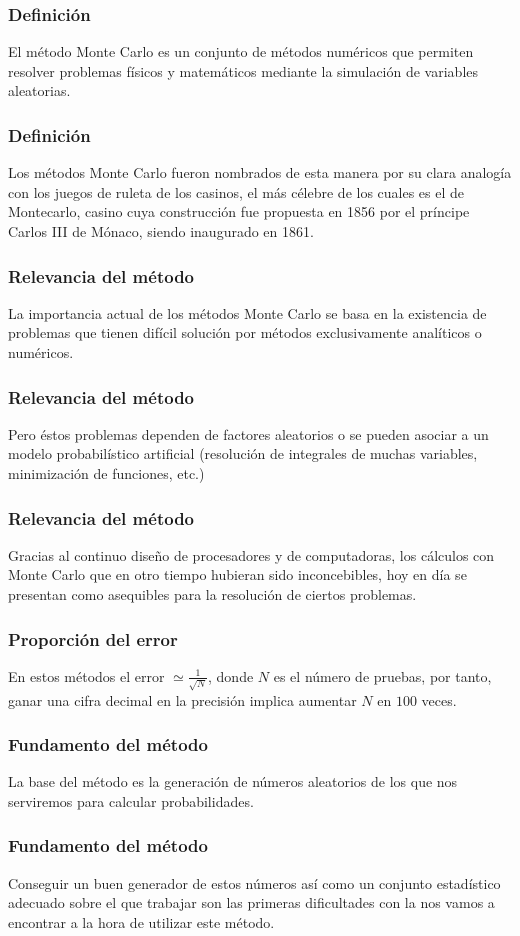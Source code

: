 \documentclass[12pt]{beamer}
\begin{document}
\begin{frame}
\frametitle{Definición}
El método Monte Carlo es un conjunto de métodos numéricos que permiten resolver problemas físicos y matemáticos mediante la simulación de variables aleatorias.
\end{frame}
\begin{frame}
\frametitle{Definición}
Los métodos Monte Carlo fueron nombrados de esta manera por su clara analogía con los juegos de ruleta de los casinos, \pause el más célebre de los cuales es el de Montecarlo, casino cuya construcción fue propuesta en 1856 por el príncipe Carlos III de Mónaco, siendo inaugurado en 1861.
\end{frame}
\begin{frame}
\frametitle{Relevancia del método}
La importancia actual de los métodos Monte Carlo se basa en la existencia de problemas que tienen difícil solución por métodos exclusivamente analíticos o numéricos.
\end{frame}
\begin{frame}
\frametitle{Relevancia del método}
Pero éstos problemas dependen de factores aleatorios o se pueden asociar a un modelo probabilístico artificial (resolución de integrales de muchas variables, minimización de funciones, etc.)
\end{frame}
\begin{frame}
\frametitle{Relevancia del método}
Gracias al continuo diseño de procesadores y de computadoras, los cálculos con Monte Carlo que en otro tiempo hubieran sido inconcebibles, hoy en día se presentan como asequibles para la resolución de ciertos problemas.
\end{frame}
\begin{frame}
 \frametitle{Proporción del error}
En estos métodos el error $\simeq \frac{1}{\sqrt{N}}$, \pause donde $N$ es el número de pruebas, por tanto, ganar una cifra decimal en la precisión implica aumentar $N$ en $100$ veces.
\end{frame}
\begin{frame}
\frametitle{Fundamento del método}
La base del método es la generación de números aleatorios de los que nos serviremos para calcular probabilidades.
\end{frame}
\begin{frame}
\frametitle{Fundamento del método}
Conseguir un buen generador de estos números así como un conjunto estadístico adecuado sobre el que trabajar son las primeras dificultades con la nos vamos a encontrar a la hora de utilizar este método.
\end{frame}
\end{document}
